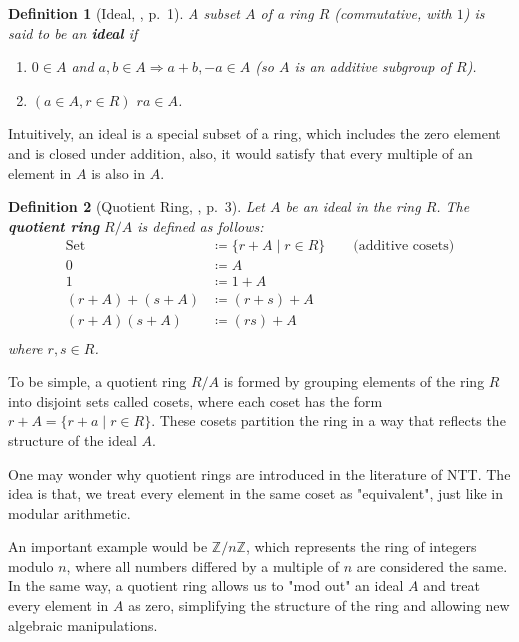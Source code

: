 \documentclass[12pt]{article}
\newtheorem{definition}{Definition}[section]
\begin{document}
\begin{definition}[Ideal, \cite{ideal_quotientring}, p.~1]
    A subset $A$ of a ring $R$ (commutative, with $1$) is said to be an \textbf{ideal} if
    \begin{enumerate}
        \item $0 \in A$ and $a, b \in A \Rightarrow a + b, -a \in A$ (so $A$ is an additive subgroup of $R$).
        \item $(a \in A, r \in R)$ $ra \in A$.
    \end{enumerate}
\end{definition}

Intuitively, 
an ideal is a special subset of a ring, 
which includes the zero element and is closed under addition, 
also, it would satisfy that every multiple of an element in $A$ is also in $A$.

\begin{definition}[Quotient Ring, \cite{ideal_quotientring}, p.~3]
    Let $A$ be an ideal in the ring $R$.
    The \textbf{quotient ring} $R/A$ is defined as follows:
    \begin{align*}
        \text{Set} &\coloneq \{r + A \mid r \in R\} \qquad \text{(additive cosets)} \\
        0 &\coloneq A \\
        1 &\coloneq 1 + A \\
        (r + A) + (s + A) &\coloneq (r + s) + A \\
        (r + A)(s + A) &\coloneq (rs) + A \\
    \end{align*}
    where $r, s \in R$.
\end{definition}

To be simple, 
a quotient ring $R/A$ is formed by grouping elements of the ring $R$ into disjoint sets called cosets, 
where each coset has the form $r + A = \{r + a \mid r \in R\}$. 
These cosets partition the ring in a way that reflects the structure of the ideal $A$.

One may wonder why quotient rings are introduced in the literature of NTT.
The idea is that, we treat every element in the same coset as "equivalent", just like in modular arithmetic. 

An important example would be $\mathbb{Z}/n\mathbb{Z}$, which represents the ring of integers modulo $n$, 
where all numbers differed by a multiple of $n$ are considered the same. 
In the same way, a quotient ring allows us to "mod out" an ideal $A$ and treat every element in $A$ as zero, simplifying the structure of the ring and allowing new algebraic manipulations.
\end{document}
